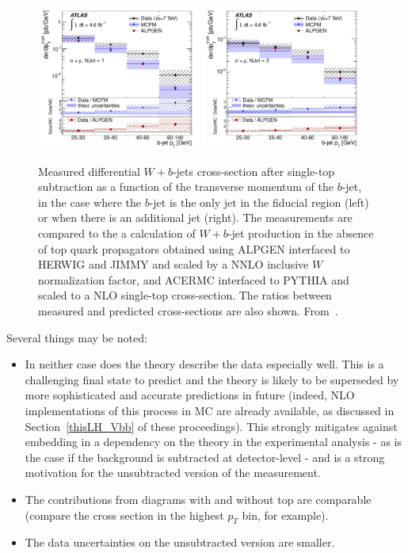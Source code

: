 \documentclass[11pt]{cernrep}
\begin{document}
\begin{figure}
\centering
	\includegraphics[width=0.48\textwidth]{fig_08a.pdf}
	\includegraphics[width=0.48\textwidth]{fig_08b.pdf}
\caption{\label{fig:notop}
Measured differential $W+b$-jets cross-section after single-top subtraction as a function of the transverse momentum of the $b$-jet, in the case where the $b$-jet is the only jet in the fiducial region (left) or when there is an additional jet (right). 
The measurements are compared to the a calculation of $W+b$-jet production in the absence of top quark propagators obtained using ALPGEN interfaced to HERWIG and JIMMY and scaled by a NNLO inclusive $W$ normalization factor, and ACERMC interfaced to PYTHIA and scaled to a NLO single-top cross-section. 
The ratios between measured and predicted cross-sections are also shown. From~\protect\cite{Aad:2013vka}.}
\end{figure}

Several things may be noted:
\begin{itemize}
\item In neither case does the theory describe the data especially well. This is a challenging
final state to predict and the theory is likely to be superseded by more sophisticated and 
accurate predictions in future (indeed, NLO implementations of this
process in MC are already available, as discussed in
Section~\ref{thisLH_Vbb} of these proceedings). This strongly mitigates against embedding in a dependency 
on the theory in the experimental analysis - as is the case if the background is subtracted at detector-level - 
and is a strong motivation for the unsubtracted version of the
measurement. 
\item The contributions from diagrams with and without top are comparable (compare the cross section in the highest $p_T$ bin, 
for example).
\item The data uncertainties on the unsubtracted version are smaller.
\end{itemize}
\end{document}
